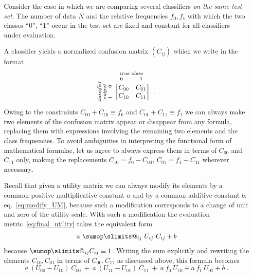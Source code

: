 \documentclass[\ifafour a4paper,12pt,\else a5paper,10pt,\fi%
onecolumn,oneside,article,%
british%
]{memoir}
\makeatletter
\theoremstyle{remark}
\theoremstyle{innote}
\def\sum{\DOTSI\sumop\slimits@}
\renewcommand*{\|}[1][]{\nonscript\:#1\vert\nonscript\:\mathopen{}}
\newcommand*{\eqn}{eq.}%
\makeatother
\begin{document}
Consider the case in which we are comparing several classifiers \emph{on the same test set}. The number of data $N$ and the relative frequencies $f_{0}, f_{1}$ with which the two classes \enquote{$0$}, \enquote{$1$} occur in the test set are fixed and constant for all classifiers under evaluation.

A classifier yields a normalized confusion matrix $(C_{ij})$ which we write in the format
\begin{equation*}
  \rotatebox[origin=c]{90}{
    \clap{\textit{\parbox{5em}{\centering\scriptsize classifier\\output\\$1\hspace{1.5em}0$}}
    }}\ 
    \overbracket[0pt]{
      \begin{bmatrix} C_{00} & C_{01} \\ C_{10} & C_{11}
      \end{bmatrix}}^{
      \clap{\textit{\parbox{6em}{\centering\scriptsize true class\\$0\hspace{3em}1$}}
    }} \ .
\end{equation*}

Owing to the constraints $C_{00} + C_{10} \equiv f_{0}$ and $C_{01} + C_{11} \equiv f_{1}$ we can always make two elements of the confusion matrix appear or disappear from any formula, replacing them with expressions involving the remaining two elements and the class frequencies. To avoid ambiguities in interpreting the functional form of mathematical formulae, let us agree to always express them in terms of $C_{00}$ and $C_{11}$ only, making the replacements $C_{10} = f_{0} - C_{00}$, $C_{01} = f_{1} - C_{11}$ wherever necessary.

Recall that given a utility matrix we can always modify its elements by a common positive multiplicative constant $a$ and by a common additive constant $b$, \eqn~\eqref{eq:modify_UM}, because such a modification corresponds to a change of unit and zero of the utility scale. With such a modification the evaluation metric~\eqref{eq:final_utility} takes the equivalent form
\begin{equation}
  \label{eq:final_utility_modified}
 a\ \sum_{ij} \ U_{ij}\ C_{ij} + b
\end{equation}
because $\sum_{ij} C_{ij} \equiv 1$. Writing the sum explicitly and rewriting the elements $C_{10}, C_{01}$ in terms of $C_{00}, C_{11}$ as discussed above, this formula becomes 
\begin{equation}
  \label{eq:final_utility_binary}
    a\ (U_{00} - U_{10})\ C_{00} \ + \ 
    a\ (U_{11} - U_{01})\ C_{11} \ + \ 
    a\ f_{0}\ U_{10} + a\ f_{1}\ U_{01} +  b \ .
\end{equation}
\end{document}
